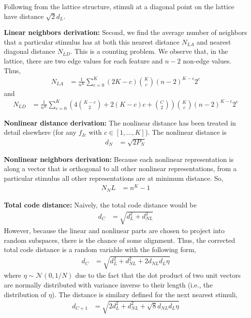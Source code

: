 \documentclass[letter,12pt]{article}
\begin{document}
Following from the lattice structure, stimuli at a diagonal point on the lattice
have distance $\sqrt{2} d_{L}$.

\textbf{Linear neighbors derivation:}
Second, we find the average number of neighbors that a particular stimulus has at
both this nearest distance $N_{LA}$ and nearest diagonal distance $N_{LD}$. This
is a counting problem. We observe that, in the lattice, there are two edge values
for each feature and $n - 2$ non-edge values. Thus,
\begin{align}
  N_{LA} &= \frac{1}{n^{K}}
  \sum_{c = 0}^{K} (2K - c)\binom{K}{c} (n - 2)^{K - c} 2^{c}
\end{align}
and
\begin{align}
  N_{LD} &= \frac{1}{n^{K}} \sum_{c = 0}^{K} \left(4\binom{K - c}{2} + 2(K - c)c
  + \binom{C}{2}\right)
  \binom{K}{c} (n - 2)^{K - c} 2^{c}
\end{align}

\textbf{Nonlinear distance derivation:}
The nonlinear distance has been treated in detail elsewhere (for any $f_{Ic}$ with
$c \in [1, ..., K]$). The nonlinear distance is
\begin{align}
  d_{N} &= \sqrt{2 P_{N}}
\end{align}

\textbf{Nonlinear neighbors derivation:}
Because each nonlinear representation is along a vector that is orthogonal to all
other nonlinear representations, from a particular stimulus all other
representations are at minimum distance. So,
\begin{align}
  N_NL &= n^{K} - 1
\end{align}

\textbf{Total code distance:}
Naively, the total code distance would be
\begin{align}
  d_{C} &= \sqrt{d_{L}^{2} + d_{NL}^{2}}
\end{align}
However, because the linear and nonlinear parts are chosen to project into random
subspaces, there is the chance of some alignment. Thus, the corrected total code
distance is a random variable with the following form,
\begin{align}
  d_{C} &= \sqrt{d_{L}^{2} + d_{NL}^{2} + 2 d_{NL} d_{L} \eta}
\end{align}
where $\eta \sim \mathcal{N}(0, 1/N)$ due to the fact that the dot product of
two unit vectors are normally distributed with variance inverse to their length
(i.e., the distribution of $\eta$). The distance is similary defined for the
next nearest stimuli,
\begin{align}
  d_{C + 1} &= \sqrt{2d_{L}^{2} + d_{NL}^{2} + \sqrt{8} d_{NL} d_{L} \eta}
\end{align}
\end{document}
